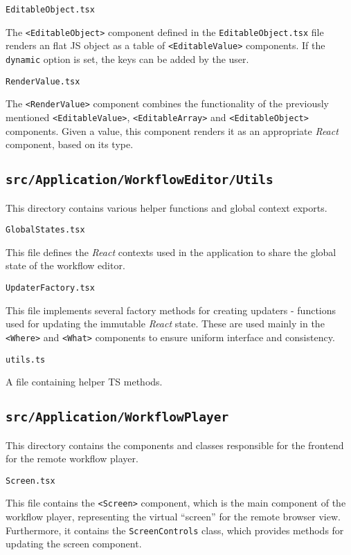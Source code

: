 \emptyline
\verb|EditableObject.tsx|
\smallskip

The \texttt{<EditableObject>} component defined in the \texttt{EditableObject.tsx} file renders an flat \acs{JS} object as a table of \texttt{<EditableValue>} components.
If the \texttt{dynamic} option is set, the keys can be added by the user.

\emptyline
\verb|RenderValue.tsx|
\smallskip

The \texttt{<RenderValue>} component combines the functionality of the previously mentioned \texttt{<EditableValue>}, \texttt{<EditableArray>} and \texttt{<EditableObject>} components.
Given a value, this component renders it as an appropriate \textit{React} component, based on its type.

\subsection{\texttt{src/Application/WorkflowEditor/Utils}}

This directory contains various helper functions and global context exports.


\emptyline
\verb|GlobalStates.tsx|
\smallskip

This file defines the \textit{React} contexts used in the application to share the global state of the workflow editor.

\emptyline
\verb|UpdaterFactory.tsx|
\smallskip

This file implements several factory methods for creating updaters - functions used for updating the immutable \textit{React} state.
These are used mainly in the \texttt{<Where>} and \texttt{<What>} components to ensure uniform interface and consistency.

\emptyline
\verb|utils.ts|
\smallskip

A file containing helper \acs{TS} methods.

\subsection{\texttt{src/Application/WorkflowPlayer}}

This directory contains the components and classes responsible for the frontend for the remote workflow player.

\emptyline
\verb|Screen.tsx|
\smallskip

This file contains the \texttt{<Screen>} component, which is the main component of the workflow player, representing the virtual ``screen'' for the remote browser view.
Furthermore, it contains the \texttt{ScreenControls} class, which provides methods for updating the screen component.

